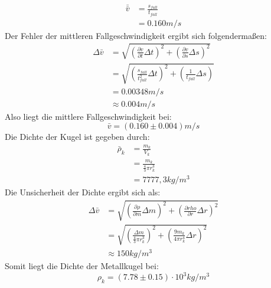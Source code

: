 \documentclass{report}
\begin{document}
\begin{equation}
    \begin{split}
        \bar{\bar{v}}  &= \frac{s_{fall}}{t_{fall}} \\
                       &= 0.160 m/s
    \end{split}
\end{equation}
Der Fehler der mittleren Fallgeschwindigkeit ergibt sich folgendermaßen:
\begin{equation}
    \begin{split}
        \Delta \bar{v} &= \sqrt{\left(\frac{\partial v}{\partial t} \Delta t\right)^2 + \left(\frac{\partial v}{\partial s} \Delta s\right)^2} \\
                       &= \sqrt{\left(\frac{s_{fall}}{t_{fall}^2} \Delta t\right)^2 + \left(\frac{1}{t_{fall}} \Delta s\right)} \\
                       &= 0.00348 m/s \\
                       &\approx 0.004m/s
    \end{split}
\end{equation}
Also liegt die mittlere Fallgeschwindigkeit bei:
\begin{equation}
    \bar{v} = (0.160 \pm 0.004) m/s
\end{equation}
Die Dichte der Kugel ist gegeben durch:
\begin{equation}
    \begin{split}
        \bar{\rho}_k &= \frac{m_k}{V_k} \\
               &= \frac{m_k}{\frac{4}{3}\pi r_k^3} \\
               &= 7777,3 kg/m^3
    \end{split}
\end{equation}
Die Unsicherheit der Dichte ergibt sich als:
\begin{equation}
    \begin{split}
        \Delta \bar{v} &= \sqrt{\left(\frac{\partial \rho}{\partial m} \Delta m\right)^2 + \left(\frac{\partial rho}{\partial r} \Delta r\right)^2} \\
                       &= \sqrt{\left(\frac{\Delta m}{\frac{4}{3} \pi r_k^3}\right)^2 + \left(\frac{9m_k}{4\pi r_k^4} \Delta r\right)^2} \\
                       &\approx 150 kg/m^3
    \end{split}
\end{equation}
Somit liegt die Dichte der Metallkugel bei:
\begin{equation}
    \rho_k = (7.78 \pm 0.15) \cdot 10^3 kg/m^3
\end{equation}
\end{document}
